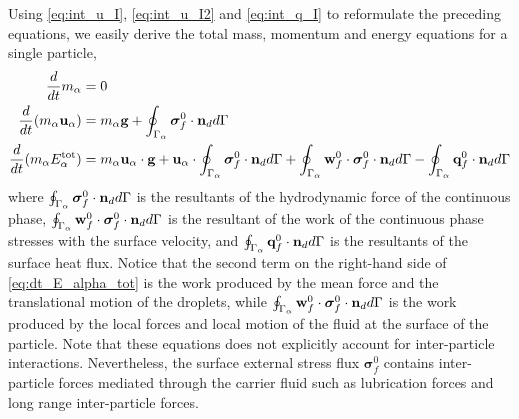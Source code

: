 Using \ref{eq:int_u_I}, \ref{eq:int_u_I2} and \ref{eq:int_q_I} to reformulate the preceding equations, we easily derive the total mass, momentum and energy equations for a single particle, 
\begin{align}
    \label{eq:dt_m_alpha}
    \frac{d}{dt} m_\alpha
    &= 
    0\\
    \label{eq:dt_p_alpha}
    \frac{d}{dt} (m_\alpha \textbf{u}_\alpha)
    &= 
    m_\alpha\textbf{g}
    +  \oint_{\Gamma_{\alpha}} \bm{\sigma}_f^0 \cdot \textbf{n}_d d\Gamma\\
    \label{eq:dt_E_alpha_tot}
    \frac{d}{dt} (m_\alpha E_\alpha^\text{tot})
    &= 
    m_\alpha \textbf{u}_\alpha \cdot \textbf{g}
    +\textbf{u}_\alpha \cdot \oint_{\Gamma_{\alpha}} \bm{\sigma}_f^0 \cdot \textbf{n}_d d\Gamma
    +\oint_{\Gamma_{\alpha}} \textbf{w}_f^0 \cdot \bm{\sigma}_f^0 \cdot  \textbf{n}_d d\Gamma 
    - \oint_{\Gamma_{\alpha}} \textbf{q}_f^0 \cdot \textbf{n}_d d\Gamma
\end{align}
where  $\oint_{\Gamma_{\alpha}}   \bm{\sigma}_f^0 \cdot \textbf{n}_d  d\Gamma$ is the resultants of the hydrodynamic force of the continuous phase, $\oint_{\Gamma_{\alpha}} \textbf{w}_f^0 \cdot \bm{\sigma}_f^0 \cdot  \textbf{n}_d d\Gamma $ is the resultant of the work of the continuous phase stresses with the surface velocity, and $\oint_{\Gamma_{\alpha}}  \textbf{q}_f^0 \cdot \textbf{n}_d  d\Gamma$ is the resultants of the surface heat flux. 
Notice that the second term on the right-hand side of \ref{eq:dt_E_alpha_tot} is the work produced by the mean force and the translational motion of the droplets, while $\oint_{\Gamma_{\alpha}} \textbf{w}_f^0 \cdot \bm{\sigma}_f^0 \cdot  \textbf{n}_d d\Gamma$ is the work produced by the local forces and local motion of the fluid at the surface of the particle.
Note that these equations does not explicitly account for inter-particle interactions. 
Nevertheless, the surface external stress flux $\bm{\sigma}_f^0$ contains inter-particle forces mediated through the carrier fluid such as lubrication forces and long range inter-particle forces.

